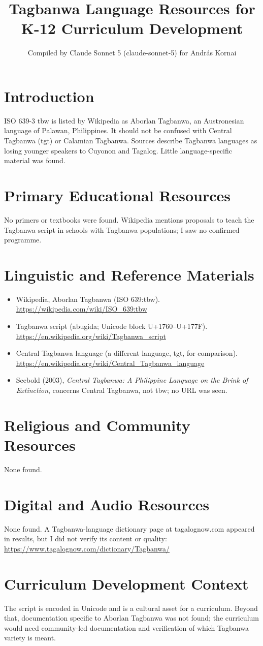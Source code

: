 \documentclass[12pt]{article}
\title{Tagbanwa Language Resources for K-12 Curriculum Development}
\author{Compiled by Claude Sonnet 5 (claude-sonnet-5) for Andr\'as Kornai}
\date{}
\begin{document}
\maketitle
\section{Introduction}
ISO 639-3 tbw is listed by Wikipedia as Aborlan Tagbanwa, an Austronesian language of Palawan, Philippines. It should not be confused with Central Tagbanwa (tgt) or Calamian Tagbanwa. Sources describe Tagbanwa languages as losing younger speakers to Cuyonon and Tagalog. Little language-specific material was found.
\section{Primary Educational Resources}
No primers or textbooks were found. Wikipedia mentions proposals to teach the Tagbanwa script in schools with Tagbanwa populations; I saw no confirmed programme.
\section{Linguistic and Reference Materials}
\begin{itemize}
\item Wikipedia, Aborlan Tagbanwa (ISO 639:tbw). \url{https://wikipedia.com/wiki/ISO_639:tbw}
\item Tagbanwa script (abugida; Unicode block U+1760--U+177F). \url{https://en.wikipedia.org/wiki/Tagbanwa_script}
\item Central Tagbanwa language (a different language, tgt, for comparison). \url{https://en.wikipedia.org/wiki/Central_Tagbanwa_language}
\item Scebold (2003), \emph{Central Tagbanwa: A Philippine Language on the Brink of Extinction}, concerns Central Tagbanwa, not tbw; no URL was seen.
\end{itemize}
\section{Religious and Community Resources}
None found.
\section{Digital and Audio Resources}
None found. A Tagbanwa-language dictionary page at tagalognow.com appeared in results, but I did not verify its content or quality: \url{https://www.tagalognow.com/dictionary/Tagbanwa/}
\section{Curriculum Development Context}
The script is encoded in Unicode and is a cultural asset for a curriculum. Beyond that, documentation specific to Aborlan Tagbanwa was not found; the curriculum would need community-led documentation and verification of which Tagbanwa variety is meant.
\end{document}
